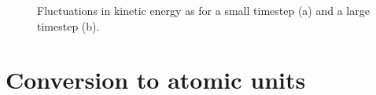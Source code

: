 \documentclass[reprint,floatfix,amsmath,amssymb,aps,pra]{revtex4-1}
\begin{document}
\begin{figure}
    \centering
     \label{fig:velocity-magnitudes}
     \label{fig:velocity-magnitudes}
    \caption{Fluctuations in kinetic energy as for a small timestep (a) and a large timestep (b).}
    \label{fig:velocity-evolution}
\end{figure}




\appendix

\section{Conversion to atomic units}



\end{document}

